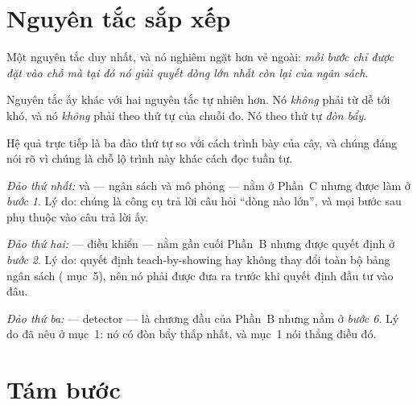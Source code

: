 \documentclass[../../marker.tex]{subfiles}
\begin{document}
\section{Nguyên tắc sắp xếp}

Một nguyên tắc duy nhất, và nó nghiêm ngặt hơn vẻ ngoài: \emph{mỗi bước chỉ được đặt vào chỗ mà tại đó nó giải quyết dòng lớn nhất còn lại của ngân sách}.

Nguyên tắc ấy khác với hai nguyên tắc tự nhiên hơn. Nó \emph{không} phải từ dễ tới khó, và nó \emph{không} phải theo thứ tự của chuỗi đo. Nó theo thứ tự \emph{đòn bẩy}.

Hệ quả trực tiếp là ba đảo thứ tự so với cách trình bày của cây, và chúng đáng nói rõ vì chúng là chỗ lộ trình này khác cách đọc tuần tự.

\emph{Đảo thứ nhất:}  và  --- ngân sách và mô phỏng --- nằm ở Phần~C nhưng được làm ở \emph{bước 1}. Lý do: chúng là công cụ trả lời câu hỏi ``dòng nào lớn'', và mọi bước sau phụ thuộc vào câu trả lời ấy.

\emph{Đảo thứ hai:}  --- điều khiển --- nằm gần cuối Phần~B nhưng được quyết định ở \emph{bước 2}. Lý do: quyết định teach-by-showing hay không thay đổi toàn bộ bảng ngân sách ( mục~5), nên nó phải được đưa ra trước khi quyết định đầu tư vào đâu.

\emph{Đảo thứ ba:}  --- detector --- là chương đầu của Phần~B nhưng nằm ở \emph{bước 6}. Lý do đã nêu ở mục~1: nó có đòn bẩy thấp nhất, và  mục~1 nói thẳng điều đó.

\section{Tám bước}
\end{document}
